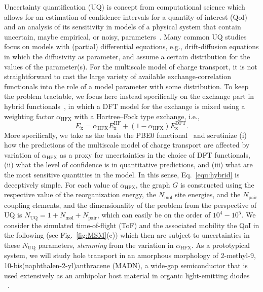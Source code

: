 \documentclass[%
 reprint,
superscriptaddress,
 amsmath,amssymb,
 aps,
prb,
floatfix
]{revtex4-2}
\newcommand{\bjoern}[2]{{\color{blue}{{\bf #1} #2}}}
\begin{document}
Uncertainty quantification (UQ) is concept from computational science which allows for an estimation of confidence intervals for a quantity of interest (QoI) and an analysis of its sensitivity in models of a physical system that contain uncertain, maybe empirical, or noisy, parameters~\cite{sarkar_uncertainty_2017,oconnor_quantifying_2024, chernatynskiy_uncertainty_2013, suleimenova_tutorial_2021,coveney_reliability_2021, coveney_when_2021}. Many common UQ studies focus on models with (partial) differential equations, e.g., drift-diffusion equations in which the diffusivity as parameter, and assume a certain distribution for the values of the parameter(s). For the multiscale model of charge transport, it is not straightforward to cast the large variety of available exchange-correlation functionals into the role of a model parameter with some distribution. To keep the problem tractable, we focus here instead specifically on the exchange part in hybrid functionals~\cite{perdew_rationale_1996,marques_densitybased_2011}, in which a DFT model for the exchange is mixed using a weighting factor $\alpha_\text{HFX}$ with a Hartree--Fock type exchange, i.e.,
%
\begin{equation}
  E_\text{x} = \alpha_\text{HFX} E_\text{x}^\text{HF} + (1-\alpha_\text{HFX})E_\text{x}^\text{DFT}.
  \label{equ:hybrid}
\end{equation}
%
More specifically, we take as the basis the PBE0 functional~\cite{adamo_toward_1999} and scrutinize (i) how the predictions of the multiscale model of charge transport are affected by variation of $\alpha_\text{HFX}$ as a proxy for uncertainties in the choice of DFT functionals, (ii) what the level of confidence is in quantitative predictions, and (iii) what are the most sensitive quantities in the model. In this sense, Eq.~\ref{equ:hybrid} is deceptively simple. For each value of $\alpha_\text{HFX}$, the graph $G$ is constructed using the respective value of the reorganization energy, the $N_\text{mol}$ site energies, and the $N_\text{pair}$ coupling elements, and the dimensionality of the problem from the perspective of UQ is $N_\text{UQ}=1+N_\text{mol}+N_\text{pair}$, which can easily be on the order of $10^{4}-10^{5}$. We consider the simulated time-of-flight (ToF) and the associated mobility the QoI in the following (see Fig.~\ref{fig:MSM}(c)) which then are subject to uncertainties in these $N_\text{UQ}$ parameters, {\em stemming} from the variation in $\alpha_\text{HFX}$. As a prototypical system, we will study hole transport in an amorphous morphology of 2-methyl-9, 10-bis(naphthalen-2-yl)anthracene (MADN), a wide-gap semiconductor that is used extensively as an ambipolar host material in organic light-emitting diodes~\cite{ko_accurate_2019, chang_great_2017} ~\bjoern{add}{citation}. 
\end{document}
